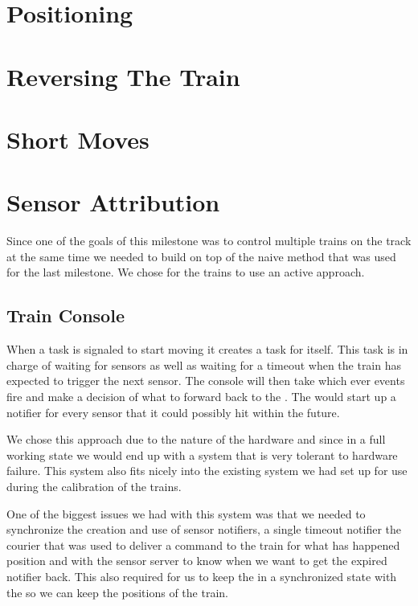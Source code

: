 \documentclass[pdftex,10pt,a4paper]{article}
\begin{document}
\section*{Positioning}

\section*{Reversing The Train}

\section*{Short Moves}

\section*{Sensor Attribution}

Since one of the goals of this milestone was to control multiple trains on the
track at the same time we needed to build on top of the naive method that was
used for the last milestone. We chose for the trains to use an active approach.

\subsection*{Train Console}

When a  task is signaled to start moving it creates a
 task for itself. This task is in charge of waiting for
sensors as well as waiting for a timeout when the train has expected to trigger
the next sensor. The console will then take which ever events fire and make a
decision of what to forward back to the . The
 would start up a notifier for every sensor that it could
possibly hit within the future.

We chose this approach due to the nature of the hardware and since in a full
working state we would end up with a system that is very tolerant to hardware
failure. This system also fits nicely into the existing system we had set up
for use during the calibration of the trains.

One of the biggest issues we had with this system was that we needed to
synchronize the creation and use of sensor notifiers, a single timeout notifier
the courier that was used to deliver a command to the train for what has
happened position and with the sensor server to know when we want to get the
expired notifier back. This also required for us to keep the
 in a synchronized state with the  so we
can keep the positions of the train.
\end{document}
